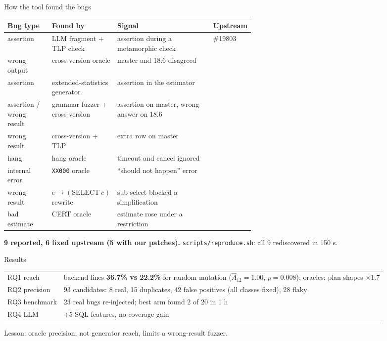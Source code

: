 \documentclass[aspectratio=169,10pt]{beamer}
\begin{document}
\begin{frame}{How the tool found the \pg bugs}
\scriptsize
\begin{tabularx}{\linewidth}{@{}L{0.18\linewidth}L{0.24\linewidth}YL{0.16\linewidth}@{}}
\toprule
Bug type & Found by & Signal & Upstream \\
\midrule
assertion & LLM fragment + TLP check & assertion during a metamorphic check &  \#19803 \\
wrong output & cross-version oracle & master and 18.6 disagreed &  \\
assertion & extended-statistics generator & assertion in the estimator &  \\
assertion / wrong result & grammar fuzzer + cross-version & assertion on master, wrong answer on 18.6 &  \\
wrong result & cross-version + TLP & extra row on master &  \\
hang & hang oracle & timeout and cancel ignored &  \\
internal error & \texttt{XX000} oracle & ``should not happen'' error &  \\
wrong result & $e\rightarrow(\mathrm{SELECT}\ e)$ rewrite & sub-select blocked a simplification &  \\
bad estimate & CERT oracle & estimate rose under a restriction &  \\
\bottomrule
\end{tabularx}

\smallskip
\small\textbf{9 reported, 6 fixed upstream (5 with our patches).} \texttt{scripts/reproduce.sh}: all 9 rediscovered in 150 s.
\end{frame}

\begin{frame}{Results}
\small
\begin{tabularx}{\linewidth}{@{}lY@{}}
\toprule
RQ1 reach & backend lines \textbf{36.7\% vs 22.2\%} for random mutation ($\hat A_{12}=1.00$, $p=0.008$); oracles: plan shapes $\times1.7$ \\
RQ2 precision & 93 candidates: 8 real, 15 duplicates, 42 false positives (all classes fixed), 28 flaky \\
RQ3 benchmark & 23 real bugs re-injected; best arm found 2 of 20 in 1 h \\
RQ4 LLM & +5 SQL features, no coverage gain \\
\bottomrule
\end{tabularx}

\medskip
Lesson: \alert{oracle precision}, not generator reach, limits a wrong-result fuzzer.
\end{frame}
\end{document}
